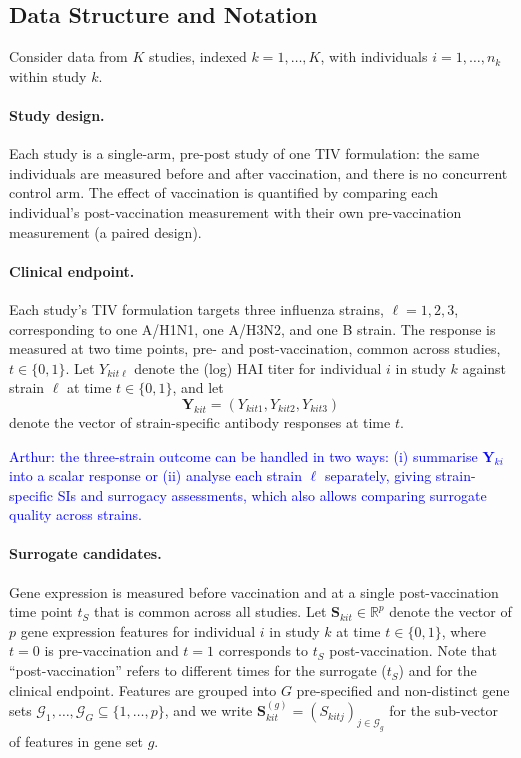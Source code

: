 \documentclass{article}
\begin{document}
\subsection*{Data Structure and Notation}

Consider data from $K$ studies, indexed $k = 1, \dots, K$, with individuals $i = 1, \dots, n_k$ within study $k$.

\paragraph{Study design.} Each study is a single-arm, pre-post study of one TIV formulation: the same individuals are measured before and after vaccination, and there is no concurrent control arm. The effect of vaccination is quantified by comparing each individual's post-vaccination measurement with their own pre-vaccination measurement (a paired design).

\paragraph{Clinical endpoint.} Each study's TIV formulation targets three influenza strains, $\ell = 1, 2, 3$, corresponding to one A/H1N1, one A/H3N2, and one B strain. The response is measured at two time points, pre- and post-vaccination, common across studies, $t \in \{0,1\}$. Let $Y_{kit\ell}$ denote the (log) HAI titer for individual $i$ in study $k$ against strain $\ell$ at time $t \in \{0,1\}$, and let
\[
\boldsymbol{Y}_{kit} = (Y_{kit1}, Y_{kit2}, Y_{kit3})
\]
denote the vector of strain-specific antibody responses at time $t$.

\textcolor{blue}{Arthur: the three-strain outcome can be handled in two ways: (i) summarise $\boldsymbol{Y}_{ki}$ into a scalar response or (ii) analyse each strain $\ell$ separately, giving strain-specific SIs and surrogacy assessments, which also allows comparing surrogate quality across strains.}

\paragraph{Surrogate candidates.} Gene expression is measured before vaccination and at a single post-vaccination time point $t_S$ that is common across all studies. Let $\boldsymbol{S}_{kit} \in \mathbb{R}^p$ denote the vector of $p$ gene expression features for individual $i$ in study $k$ at time $t \in \{0,1\}$, where $t=0$ is pre-vaccination and $t=1$ corresponds to $t_S$ post-vaccination. Note that ``post-vaccination'' refers to different times for the surrogate ($t_S$) and for the clinical endpoint. Features are grouped into $G$ pre-specified and non-distinct gene sets $\mathcal{G}_1, \dots, \mathcal{G}_G \subseteq \{1, \dots, p\}$, and we write $\boldsymbol{S}_{kit}^{(g)} = (S_{kitj})_{j \in \mathcal{G}_g}$ for the sub-vector of features in gene set $g$.
\end{document}
